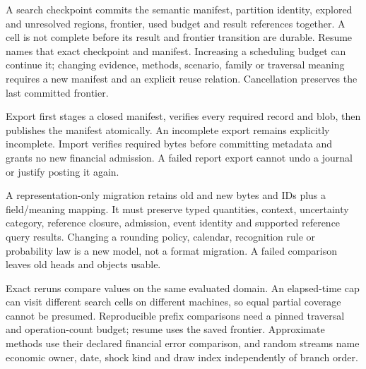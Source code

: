 A search checkpoint commits the semantic manifest, partition identity, explored
and unresolved regions, frontier, used budget and result references together.
A cell is not complete before its result and frontier transition are durable.
Resume names that exact checkpoint and manifest. Increasing a scheduling budget
can continue it; changing evidence, methods, scenario, family or traversal meaning
requires a new manifest and an explicit reuse relation. Cancellation preserves
the last committed frontier.

Export first stages a closed manifest, verifies every required record and blob,
then publishes the manifest atomically. An incomplete export remains explicitly
incomplete. Import verifies required bytes before committing metadata and grants
no new financial admission. A failed report export cannot undo a journal or
justify posting it again.

A representation-only migration retains old and new bytes and IDs plus a
field/meaning mapping. It must preserve typed quantities, context, uncertainty
category, reference closure, admission, event identity and supported reference
query results. Changing a rounding policy, calendar, recognition rule or
probability law is a new model, not a format migration. A failed comparison
leaves old heads and objects usable.

Exact reruns compare values on the same evaluated domain. An elapsed-time cap
can visit different search cells on different machines, so equal partial
coverage cannot be presumed. Reproducible prefix comparisons need a pinned
traversal and operation-count budget; resume uses the saved frontier. Approximate
methods use their declared financial error comparison, and random streams name
economic owner, date, shock kind and draw index independently of branch order.
